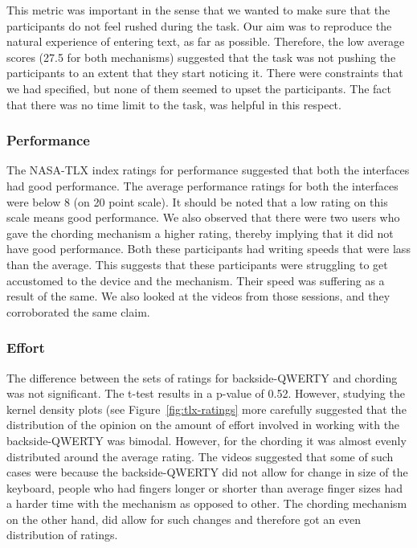 This metric was important in the sense that we wanted to make sure
that the participants do not feel rushed during the task. Our aim was
to reproduce the natural experience of entering text, as far as
possible. Therefore, the low average scores (27.5 for both mechanisms)
suggested that the task was not pushing the participants to an extent
that they start noticing it. There were constraints that we had
specified, but none of them seemed to upset the participants. The fact
that there was no time limit to the task, was helpful in this respect.

\subsubsection{Performance}

The NASA-TLX index ratings for performance suggested that both the
interfaces had good performance. The average performance ratings for
both the interfaces were below 8 (on 20 point scale). It should be
noted that a low rating on this scale means good performance. We also
observed that there were two users who gave the chording mechanism a
higher rating, thereby implying that it did not have good
performance. Both these participants had writing speeds that were lass
than the average. This suggests that these participants were
struggling to get accustomed to the device and the mechanism. Their
speed was suffering as a result of the same. We also looked at the
videos from those sessions, and they corroborated the same claim.

\subsubsection{Effort}

The difference between the sets of ratings for backside-QWERTY and
chording was not significant. The t-test results in a p-value of
0.52. However, studying the kernel density plots (see
Figure~\ref{fig:tlx-ratings} more carefully suggested that the
distribution of the opinion on the amount of effort involved in
working with the backside-QWERTY was bimodal. However, for the
chording it was almost evenly distributed around the average
rating. The videos suggested that some of such cases were because the
backside-QWERTY did not allow for change in size of the keyboard,
people who had fingers longer or shorter than average finger sizes had
a harder time with the mechanism as opposed to other. The chording
mechanism on the other hand, did allow for such changes and therefore
got an even distribution of ratings.

